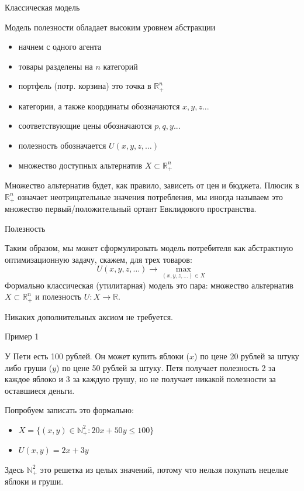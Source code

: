 \documentclass{beamer}
\begin{document}
\begin{frame}{Классическая модель}

Модель полезности обладает высоким уровнем абстракции

\begin{itemize}
\item начнем с одного агента
\item товары разделены на $n$ категорий
\item портфель (потр. корзина) это точка в $\mathbb{R}_{+}^{n}$	
\item категории, а также координаты обозначаются $x, y, z...$
\item соответствующие цены обозначаются $p, q, y...$
\item полезность обозначается $U(x,y,z, \ldots)$
\item множество доступных альтернатив $X \subset \mathbb{R}_{+}^{n}$
\end{itemize}

Множество альтернатив будет, как правило, зависеть от цен и бюджета. Плюсик в $\mathbb{R}_{+}^{n}$ означает неотрицательные значения потребления, мы иногда называем это множество \alert{первый/положительный ортант Евклидового пространства}.


\end{frame}

\begin{frame}{Полезность}

Таким образом, мы может сформулировать модель потребителя как абстрактную оптимизационную задачу, скажем, для трех товаров:
$$ U(x,y,z, \ldots) \to \max_{(x,y,z, \ldots) \in X}$$
Формально \alert{классическая  (утилитарная) модель} это пара: множество альтернатив $X \subset \mathbb{R}^n_{+}$ и полезность $U: X \to \mathbb{R}$.

Никаких дополнительных аксиом не требуется.

\end{frame}

\begin{frame}{Пример 1}

У Пети есть 100 рублей. Он может купить яблоки ($x$) по цене 20 рублей за штуку либо груши ($y$) по цене 50 рублей за штуку. Петя получает полезность 2 за каждое яблоко и 3 за каждую грушу, но не получает никакой полезности за оставшиеся деньги. 

Попробуем записать это формально:

\begin{itemize}
  \item $X = \{(x, y) \in  \mathbb{N}^2_{+}: 20 x + 50 y \leqslant 100 \}$
  \item $U(x, y) = 2x + 3y$
\end{itemize}

Здесь $\mathbb{N}^2_{+}$ это \alert{решетка из целых значений}, потому что нельзя покупать нецелые яблоки и груши.

\end{frame}
\end{document}
